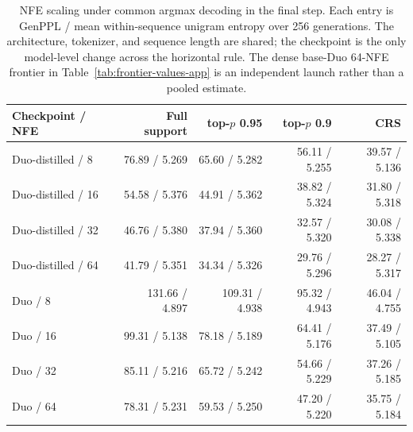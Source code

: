 \documentclass{article}
\newcommand{\1}{\mathbf 1}
\theoremstyle{definition}
\begin{document}
\begin{table}[H]
\centering
\small
\setlength{\tabcolsep}{4.2pt}
\begin{tabular}{@{}lrrrr@{}}
\toprule
Checkpoint / NFE & Full support & top-$p$ 0.95 & top-$p$ 0.9 & CRS \\
\midrule
Duo-distilled / 8  & 76.89 / 5.269 & 65.60 / 5.282 & 56.11 / 5.255 & 39.57 / 5.136 \\
Duo-distilled / 16 & 54.58 / 5.376 & 44.91 / 5.362 & 38.82 / 5.324 & 31.80 / 5.318 \\
Duo-distilled / 32 & 46.76 / 5.380 & 37.94 / 5.360 & 32.57 / 5.320 & 30.08 / 5.338 \\
Duo-distilled / 64 & 41.79 / 5.351 & 34.34 / 5.326 & 29.76 / 5.296 & 28.27 / 5.317 \\
\midrule
Duo / 8  & 131.66 / 4.897 & 109.31 / 4.938 & 95.32 / 4.943 & 46.04 / 4.755 \\
Duo / 16 &  99.31 / 5.138 &  78.18 / 5.189 & 64.41 / 5.176 & 37.49 / 5.105 \\
Duo / 32 &  85.11 / 5.216 &  65.72 / 5.242 & 54.66 / 5.229 & 37.26 / 5.185 \\
Duo / 64 &  78.31 / 5.231 &  59.53 / 5.250 & 47.20 / 5.220 & 35.75 / 5.184 \\
\bottomrule
\end{tabular}
\caption{NFE scaling under common argmax decoding in the final step. Each
entry is GenPPL / mean within-sequence unigram entropy over 256 generations.
The architecture, tokenizer, and sequence length are shared; the checkpoint is
the only model-level change across the horizontal rule. The dense base-Duo
64-NFE frontier in Table~\ref{tab:frontier-values-app} is an independent launch
rather than a pooled estimate.}
\label{tab:nfe-scaling-app}
\end{table}
\end{document}
